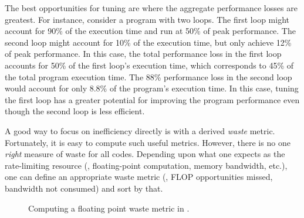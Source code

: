 \documentclass[11pt,twoside,letterpaper]{report}
\begin{document}
The best opportunities for tuning are where the aggregate performance losses are greatest.
For instance, consider a program with two loops.
The first loop might account for 90\% of the execution time and run at 50\% of peak performance.
The second loop might account for 10\% of the execution time, but only achieve 12\% of peak performance.
In this case, the total performance loss in the first loop accounts for 50\% of the first loop's execution time, which corresponds to 45\% of the total program execution time.
The 88\% performance loss in the second loop would account for only 8.8\% of the program's execution time.
In this case, tuning the first loop has a greater potential for improving the program performance even though the second loop is less efficient.

A good way to focus on inefficiency directly is with a derived {\em waste} metric.
Fortunately, it is easy to compute such useful metrics.
However, there is no one {\em right} measure of waste for all codes.
Depending upon what one expects as the rate-limiting resource (\eg, floating-point computation, memory bandwidth, etc.), one can define an appropriate waste metric (\eg, FLOP opportunities missed, bandwidth not consumed) and sort by that.


\begin{figure}[t]
\caption{Computing a floating point waste metric in \hpcviewer{}.}
\label{fig:fpwaste}
\end{figure}
\end{document}
